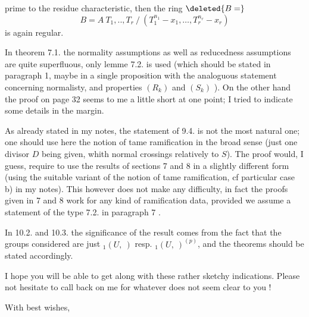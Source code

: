 prime to the residue characteristic, then the ring $\deleted{B=}$
\[
B=A\ T_1,..,T_r\ /\ (T_1^{n_1}-x_1,\ldots,T_r^{n_r}-x_r)
\]
is again regular.

In theorem 7.1. the normality assumptions as well as reducedness assumptions are quite superfluous, only lemme 7.2. is used (which should be stated in paragraph 1, maybe in a single proposition with the analoguous statement concerning normalisty, and properties $(R_k)$ and $(S_k)$ ). On the other hand the proof on page 32 seems to me  a little short at one point; I tried to indicate some details in the margin.

As already stated in my notes, the statement of 9.4. is not the most natural one; one should use here the notion of tame ramification in the broad sense (just one divisor $D$ being given, whith normal crossings relatively to $S$).  The proof would, I guess, require to use the results of sections 7 and 8 in a slightly different form (using the suitable variant of the notion of tame ramification, cf  particular case b) in my notes). This however does not make any difficulty, in fact the proofs given in 7 and 8 work for any kind of ramification data, provided we assume a statement of the type 7.2. in paragraph 7 .

In 10.2. and 10.3. the significance of the result comes from the fact that the groups considered are just ${}_1(U,\ )$ resp. ${}_1(U,\ )^{(p)}$, and the theorems should be stated accordingly.

I hope you will be able to get along with these rather sketchy indications. Please  not hesitate to call back on me for whatever does not seem clear to you !

With best wishes,\\
